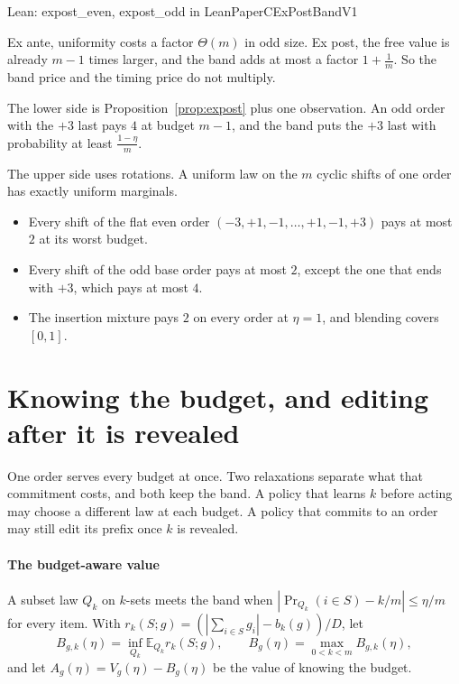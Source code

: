 \documentclass[conference]{IEEEtran}
\theoremstyle{definition}
\newcommand{\lean}[1]{\textsf{\footnotesize #1}}
\newcommand{\leanbox}[1]{%
  \par\vspace{2pt}\noindent
  {\raggedright\footnotesize\textsf{Lean: #1}\par}\vspace{2pt}}
\begin{document}
\leanbox{\lean{expost\_even}, \lean{expost\_odd} in \lean{LeanPaperCExPostBandV1}}

Ex ante, uniformity costs a factor $\Theta(m)$ in odd size. Ex post, the free value is
already $m-1$ times larger, and the band adds at most a factor $1+\frac1m$. So the band price
and the timing price do not multiply.

The lower side is Proposition~\ref{prop:expost} plus one observation. An odd order with the
$+3$ last pays $4$ at budget $m-1$, and the band puts the $+3$ last with probability at least
$\frac{1-\eta}{m}$.

The upper side uses rotations. A uniform law on the $m$ cyclic shifts of one order has exactly
uniform marginals.
\begin{itemize}
\item Every shift of the flat even order $(-3,+1,-1,\dots,+1,-1,+3)$ pays at most $2$ at its
worst budget.
\item Every shift of the odd base order pays at most $2$, except the one that ends with $+3$,
which pays at most $4$.
\item The insertion mixture pays $2$ on every order at $\eta=1$, and blending covers $[0,1]$.
\end{itemize}

\section{Knowing the budget, and editing after it is revealed}
\label{sec:aware}

One order serves every budget at once. Two relaxations separate what that commitment costs,
and both keep the band. A policy that learns $k$ before acting may choose a different law at
each budget. A policy that commits to an order may still edit its prefix once $k$ is revealed.

\paragraph{The budget-aware value} A subset law $Q_{k}$ on $k$-sets meets the band when
$|\Pr_{Q_{k}}(i\in S)-k/m|\le\eta/m$ for every item. With
$r_{k}(S;g)=(|\sum_{i\in S}g_{i}|-b_{k}(g))/D$, let
\[
B_{g,k}(\eta)=\inf_{Q_{k}}\mathbb{E}_{Q_{k}}r_{k}(S;g),\qquad
B_{g}(\eta)=\max_{0<k<m}B_{g,k}(\eta),
\]
and let $A_{g}(\eta)=V_{g}(\eta)-B_{g}(\eta)$ be the value of knowing the budget.
\end{document}
